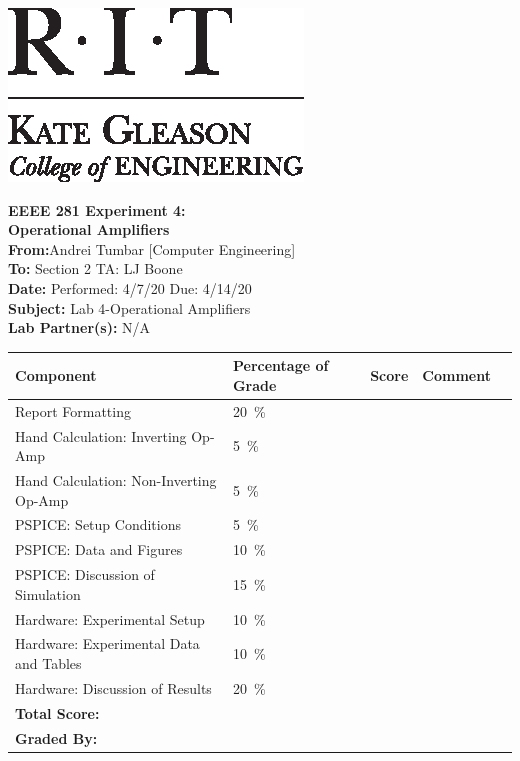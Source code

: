 \documentclass[11pt]{article}
\begin{document}
	\hspace{6in}
		\includegraphics[scale=0.9,trim=0cm 0in 0in 0.0in,clip]{RIT_KGCOE1}
\newline

\Huge \textbf{EEEE 281 Experiment 4:\\ Operational Amplifiers}\\

\Large
\textbf{From:}Andrei Tumbar [Computer Engineering] \\
\textbf{To: } Section 2 TA: LJ Boone \\
\textbf{Date: } Performed: 4/7/20  Due: 4/14/20 \\
\textbf{Subject: } Lab 4-Operational Amplifiers\\
\textbf{Lab Partner(s): } N/A\\
\vspace{0.5in}
	\begin{table}[h!]
		\centering
		\begin{tabular}{|l||l|l|l|l|}
			\hline
			Component & Percentage of Grade   & Score \hspace{0.5in} & Comment \hspace{0.75in}  \\
			\hline
			Report Formatting & 20~\si{\percent} & & \\	 
			\hline
			\hline 
			Hand Calculation: Inverting Op-Amp & 5~\si{\percent} & & \\	 
			 \hline
		    Hand Calculation: Non-Inverting Op-Amp & 5~\si{\percent} & & \\	 
			 \hline
			PSPICE: Setup Conditions & 5~\si{\percent} & & \\	 
			 \hline
			PSPICE: Data and Figures & 10~\si{\percent} & & \\	 
			 \hline
			PSPICE: Discussion of Simulation & 15~\si{\percent} & & \\	 
			\hline
			\hline
			Hardware: Experimental Setup & 10~\si{\percent} & & \\	 
			\hline
			Hardware: Experimental Data and Tables & 10~\si{\percent} & & \\	 
			\hline
			Hardware: Discussion of Results & 20~\si{\percent} & & \\	 
			\hline
			\textbf{Total Score:}&  & & \\	 
			\hline
			\textbf{Graded By:}&  & & \\	 
			\hline
		\end{tabular}
	\end{table}
\newpage
\end{document}

